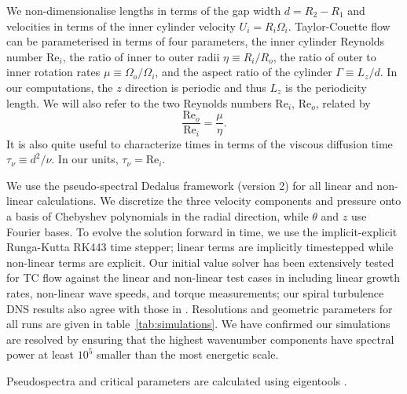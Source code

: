 \documentclass[openacc]{rstransa}%
\newcommand{\Reyn}{\mathrm{Re}}
\begin{document}
We non-dimensionalise lengths in terms of the gap width $d = R_2 - R_1$ and velocities in terms of the inner cylinder velocity $U_i = R_i \Omega_i$. Taylor-Couette flow can be parameterised in terms of four parameters, the inner cylinder Reynolds number $\Reyn_i$, the ratio of inner to outer radii $\eta \equiv R_i/R_o$, the ratio of outer to inner rotation rates $\mu \equiv \Omega_o/\Omega_i$, and the aspect ratio of the cylinder $\Gamma \equiv L_z/d$. In our computations, the $z$ direction is periodic and thus $L_z$ is the periodicity length. We will also refer to the two Reynolds numbers $\Reyn_i$, $\Reyn_o$, related by
\begin{equation}
    \frac{\Reyn_o}{\Reyn_i} = \frac{\mu}{\eta}.
\end{equation}
It is also quite useful to characterize times in terms of the viscous diffusion time $\tau_\nu \equiv d^2/\nu$. In our units, $\tau_\nu = \Reyn_i$.

We use the pseudo-spectral Dedalus framework (version 2) \cite{2020PhRvR...2b3068B} for all linear and non-linear calculations. We discretize the three velocity components and pressure onto a basis of Chebyshev polynomials in the radial direction, while $\theta$ and $z$ use Fourier bases.
To evolve the solution forward in time, we use the implicit-explicit Runga-Kutta RK443 time stepper; linear terms are implicitly timestepped while non-linear terms are explicit.
Our initial value solver has been extensively tested for TC flow against the linear and non-linear test cases in \cite{1984JFM...146...45M, 1984JFM...146...65M} including linear growth rates, non-linear wave speeds, and torque measurements; our spiral turbulence DNS results also agree with those in \cite{2009PhRvE..80d6315M,2009PhRvE..80f7301D,2011JFM...668..150D}. 
Resolutions and geometric parameters for all runs are given in table~\ref{tab:simulations}.
We have confirmed our simulations are resolved by ensuring that the highest wavenumber components have spectral power at least $10^5$ smaller than the most energetic scale.

Pseudospectra and critical parameters are calculated using eigentools \cite{2021JOSS....6.3079O}.
\end{document}
